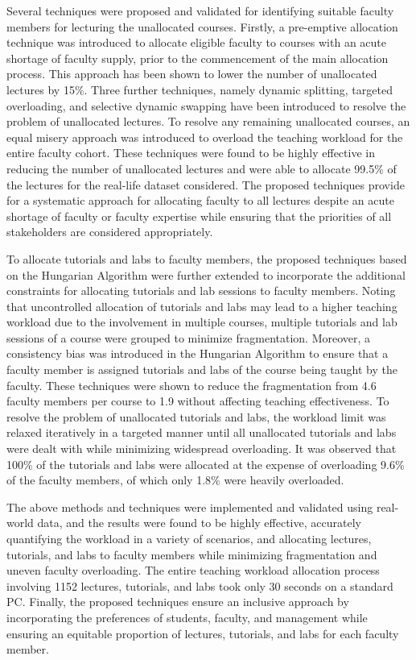 Several techniques were proposed and validated for identifying suitable faculty members for lecturing the unallocated courses. Firstly, a pre-emptive allocation technique was introduced to allocate eligible faculty to courses with an acute shortage of faculty supply, prior to the commencement of the main allocation process. This approach has been shown to lower the number of unallocated lectures by 15\%. Three further techniques, namely dynamic splitting, targeted overloading, and selective dynamic swapping have been introduced to resolve the problem of unallocated lectures. To resolve any remaining unallocated courses, an equal misery approach was introduced to overload the teaching workload for the entire faculty cohort. These techniques were found to be highly effective in reducing the number of unallocated lectures and were able to allocate 99.5\% of the lectures for the real-life dataset considered. The proposed techniques provide for a systematic approach for allocating faculty to all lectures despite an acute shortage of faculty or faculty expertise while ensuring that the priorities of all stakeholders are considered appropriately.

To allocate tutorials and labs to faculty members, the proposed techniques based on the Hungarian Algorithm were further extended to incorporate the additional constraints for allocating tutorials and lab sessions to faculty members. Noting that uncontrolled allocation of tutorials and labs may lead to a higher teaching workload due to the involvement in multiple courses, multiple tutorials and lab sessions of a course were grouped to minimize fragmentation. Moreover, a consistency bias was introduced in the Hungarian Algorithm to ensure that a faculty member is assigned tutorials and labs of the course being taught by the faculty. These techniques were shown to reduce the fragmentation from 4.6 faculty members per course to 1.9 without affecting teaching effectiveness. To resolve the problem of unallocated tutorials and labs, the workload limit was relaxed iteratively in a targeted manner until all unallocated tutorials and labs were dealt with while minimizing widespread overloading. It was observed that 100\% of the tutorials and labs were allocated at the expense of overloading 9.6\% of the faculty members, of which only 1.8\% were heavily overloaded.

The above methods and techniques were implemented and validated using real-world data, and the results were found to be highly effective, accurately quantifying the workload in a variety of scenarios, and allocating lectures, tutorials, and labs to faculty members while minimizing fragmentation and uneven faculty overloading. The entire teaching workload allocation process involving 1152 lectures, tutorials, and labs took only 30 seconds on a standard PC. Finally, the proposed techniques ensure an inclusive approach by incorporating the preferences of students, faculty, and management while ensuring an equitable proportion of lectures, tutorials, and labs for each faculty member.

